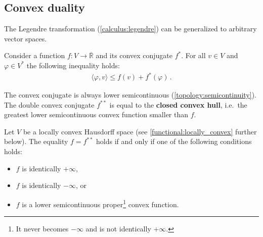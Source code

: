 \subsection{Convex duality}

    The Legendre transformation (\cref{calculus:legendre}) can be generalized to arbitrary vector spaces.
    \begin{property}
        Consider a function $f:V\rightarrow\overline{\mathbb{R}}$ and its convex conjugate $f^*$. For all $v\in V$ and $\varphi\in V^*$ the following inequality holds:
        \begin{gather}
            \langle\varphi,v\rangle\leq f(v)+f^*(\varphi)\,.
        \end{gather}
    \end{property}

    \begin{property}
        The convex conjugate is always lower semicontinuous (\cref{topology:semicontinuity}). The double convex conjugate $f^{**}$ is equal to the \textbf{closed convex hull}, i.e.~the greatest lower semicontinuous convex function smaller than $f$.
    \end{property}

    \begin{theorem}
        Let $V$ be a locally convex Hausdorff space (see \cref{functional:locally_convex} further below). The equality $f=f^{**}$ holds if and only if one of the following conditions holds:
        \begin{itemize}
            \item $f$ is identically $+\infty$,
            \item $f$ is identically $-\infty$, or
            \item $f$ is a lower semicontinuous proper\footnote{It never becomes $-\infty$ and is not identically $+\infty$.} convex function.
        \end{itemize}
    \end{theorem}

